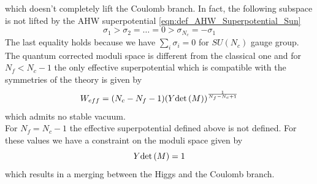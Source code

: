 which doesn't completely lift the Coulomb branch.
In fact, the following subspace is not lifted by the AHW superpotential \eqref{eqn:def_AHW_Superpotential_Sun}
\begin{equation}
 \sigma_1 > \sigma_2 = \dots = 0 > \sigma_{N_c} = - \sigma_1
 \label{eqn:ahw_subspace_unlifted}
\end{equation}
The last equality holds because we have $\sum_i \sigma_i = 0$ for $SU(N_c)$ gauge group.
\\
The quantum corrected moduli space is different from the classical one and for $N_f < N_c -1 $ the only effective superpotential which is compatible with the symmetries of the theory is given by \cite{Aharony:1997bx}
\begin{equation}
 W_{eff} = (N_c - N_f - 1) ( Y \mathrm{det } \,{(M)} ) ^{\frac{1}{N_f - N_c +1}}
\end{equation}
which admits no stable vacuum.\\
For $N_f = N_c - 1 $ the effective superpotential defined above is not defined.
For these values we have a constraint on the moduli space given by \cite{Aharony:1997bx} 
\begin{equation}
Y \mathrm{det } \,( M) = 1
\label{eqn:suN-3d-nf-nc-1-vacuum}
\end{equation}
which results in a merging between the Higgs and the Coulomb branch.

